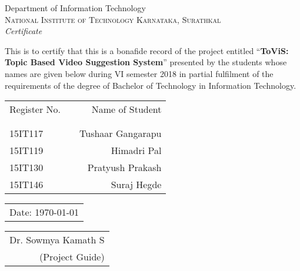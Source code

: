 \newpage
\thispagestyle{empty}

\begin{center}

\huge{Department of Information Technology}\\[0.5cm]
\normalsize
\textsc{National Institute of Technology Karnataka, Surathkal}\\[2.0cm]

\emph{\LARGE Certificate}\\[2cm]
\end{center}
\normalsize This is to certify that this is a bonafide record of the project entitled ``\textbf{ToViS: Topic Based Video Suggestion System}'' presented by the students whose names are given below during VI semester 2018 in partial fulfilment of the requirements of the degree of Bachelor of Technology in Information Technology.\\[1.0cm]

\begin{table}[h]
\centering
\bgroup
\def\arraystretch{1.2}
\begin{tabular}{lcr}
Register No. & & Name of Student \\ \\ \hline
\\
15IT117 & & Tushaar Gangarapu \\ 
15IT119 & & Himadri Pal \\
15IT130 & & Pratyush Prakash \\
15IT146 & & Suraj Hegde \\
\end{tabular}
\egroup
\end{table}

\vfill


\noindent
\begin{tabular}[t]{@{}l} 
\\
Date: \today
\end{tabular}
\hfill%
\begin{tabular}[t]{r@{}}
Dr. Sowmya Kamath S \\
(Project Guide)
\end{tabular}
